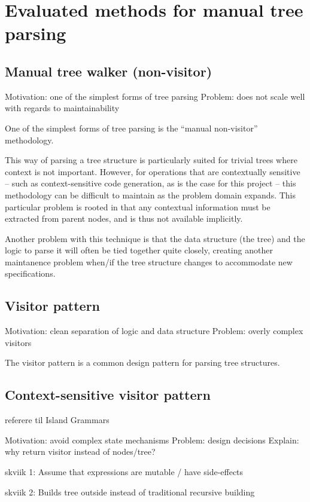 \section{Evaluated methods for manual tree parsing}
\label{sect:method:evaluated_methods}

\subsection{Manual tree walker (non-visitor)}
\label{sect:method:evaluated_methods:manual_walker}
Motivation: one of the simplest forms of tree parsing
Problem: does not scale well with regards to maintainability

One of the simplest forms of tree parsing is the ``manual non-visitor''
methodology.

This way of parsing a tree structure is particularly suited for trivial trees
where context is not important. However, for operations that are contextually 
sensitive -- such as context-sensitive code generation, as is the case for this
project -- this methodology can be difficult to maintain as the problem domain 
expands. This particular problem is rooted in that any contextual information
must be extracted from parent nodes, and is thus not available implicitly.

Another problem with this technique is that the data structure (the tree) and
the logic to parse it will often be tied together quite closely, creating
another maintanence problem when/if the tree structure changes to
accommodate new specifications.

\subsection{Visitor pattern}
\label{sect:method:evaluated_methods}
Motivation: clean separation of logic and data structure 
Problem: overly complex visitors

The visitor pattern is a common design pattern for parsing tree structures. 

\subsection{Context-sensitive visitor pattern}
\label{sect:method:evaluated_methods}

referere til Island Grammars


Motivation: avoid complex state mechanisms
Problem: design decisions
Explain: why return visitor instead of nodes/tree?

skviik 1: Assume that expressions are mutable / have side-effects

skviik 2: Builds tree outside instead of traditional recursive building